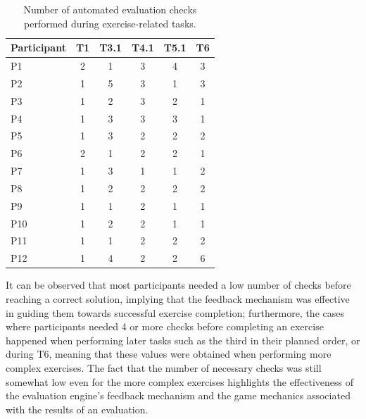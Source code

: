 \begin{table}[H]
\centering
\small
\caption{Number of automated evaluation checks performed during exercise-related tasks.} 
\setlength{\tabcolsep}{8.7mm}
\begin{tabular}{lccccc} \toprule
\textbf{Participant}& \textbf{T1} & \textbf{T3.1} & \textbf{T4.1} & \textbf{T5.1} & \textbf{T6}\\ 
\midrule
P1 & 2 & 1 & 3 & 4 & 3 \\
P2 & 1 & 5 & 3 & 1 & 3 \\
P3 & 1 & 2 & 3 & 2 & 1 \\
P4 & 1 & 3 & 3 & 3 & 1 \\
P5 & 1 & 3 & 2 & 2 & 2 \\
P6 & 2 & 1 & 2 & 2 & 1 \\
P7 & 1 & 3 & 1 & 1 & 2 \\
P8 & 1 & 2 & 2 & 2 & 2 \\
P9 & 1 & 1 & 2 & 1 & 1 \\
P10 &1 & 2 & 2 & 1 & 1 \\
P11 &1 & 1 & 2 & 2 & 2 \\
P12 &1 & 4 & 2 & 2 & 6 \\ 
\bottomrule
\end{tabular}
\label{tab:checks}
\end{table}

It can be observed that most participants needed a low number of checks before reaching a correct solution, implying that the feedback mechanism was effective in guiding them towards successful exercise completion; furthermore, the cases where participants needed 4 or more checks before completing an exercise happened when performing later tasks such as the third in their planned order, or during T6, meaning that these values were obtained when performing more complex exercises. The fact that the number of necessary checks was still somewhat low even for the more complex exercises highlights the effectiveness of the evaluation engine's feedback mechanism and the game mechanics associated with the results of an evaluation.


